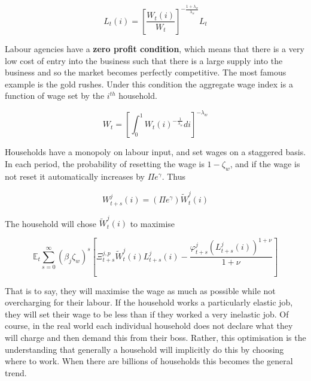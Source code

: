 \documentclass[notitlepage,12pt]{report}
\begin{document}
\begin{appendices}
	\begin{equation}
	L_t(i)=\left[\frac{W_t(i)}{W_t}\right]^{-\frac{1+\lambda_w}{\lambda_w}}L_t
	\end{equation}
	
	Labour agencies have a {\bf zero profit condition}, which means that there is a very low cost of entry into the business such that there is a large supply into the business and so the market becomes perfectly competitive. The most famous example is the gold rushes. Under this condition the aggregate wage index is a function of wage set by the \(i^{th}\) household.
	
	\begin{equation}
	W_t=\left[\int_0^1W_t(i)^{-\frac{1}{\lambda_w}}di\right]^{-\lambda_w}
	\end{equation}
	
	Households have a monopoly on labour input, and set wages on a staggered basis. In each period, the probability of resetting the wage is \(1-\zeta_w\), and if the wage is not reset it automatically increases by \(\Pi e^\gamma\). Thus
	
	\begin{equation}
	W_{t+s}^j(i)=(\Pi e^\gamma)\tilde{W}_t^j(i)
	\end{equation}
	
	The household will chose \(\tilde{W}_t^j(i)\) to maximise
	
	\begin{equation*}
	\mathbb{E}_t\sum_{s=0}^\infty(\beta_j\zeta_w)^s\left[\Xi_{t+s}^{j,p}\tilde{W}_t^j(i)L_{t+s}^j(i)-\frac{\varphi_{t+s}^j(L_{t+s}^j(i))^{1+\nu}}{1+\nu}\right]
	\end{equation*}
	
	That is to say, they will maximise the wage as much as possible while not overcharging for their labour. If the household works a particularly elastic job, they will set their wage to be less than if they worked a very inelastic job. Of course, in the real world each individual household does not declare what they will charge and then demand this from their boss. Rather, this optimisation is the understanding that generally a household will implicitly do this by choosing where to work. When there are billions of households this becomes the general trend.
	

\end{appendices}
\end{document}
